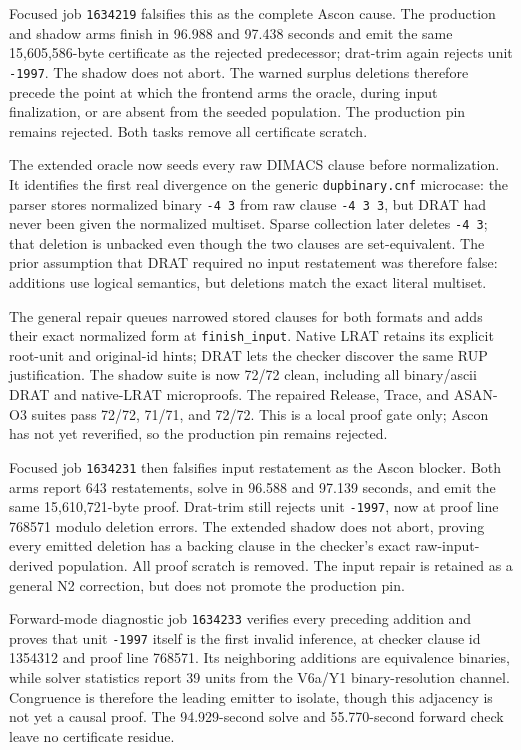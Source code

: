 \documentclass[11pt]{article}
\newcommand{\code}[1]{\texttt{#1}}
\begin{document}
Focused job \code{1634219} falsifies this as the complete Ascon cause. The
production and shadow arms finish in 96.988 and 97.438 seconds and emit the
same 15,605,586-byte certificate as the rejected predecessor; drat-trim again
rejects unit \code{-1997}. The shadow does not abort. The warned surplus
deletions therefore precede the point at which the frontend arms the oracle,
during input finalization, or are absent from the seeded population. The
production pin remains rejected. Both tasks remove all certificate scratch.

The extended oracle now seeds every raw DIMACS clause before normalization.
It identifies the first real divergence on the generic \code{dupbinary.cnf}
microcase: the parser stores normalized binary \code{-4 3} from raw clause
\code{-4 3 3}, but DRAT had never been given the normalized multiset. Sparse
collection later deletes \code{-4 3}; that deletion is unbacked even though the
two clauses are set-equivalent. The prior assumption that DRAT required no
input restatement was therefore false: additions use logical semantics, but
deletions match the exact literal multiset.

The general repair queues narrowed stored clauses for both formats and adds
their exact normalized form at \code{finish\_input}. Native LRAT retains its
explicit root-unit and original-id hints; DRAT lets the checker discover the
same RUP justification. The shadow suite is now 72/72 clean, including all
binary/ascii DRAT and native-LRAT microproofs. The repaired Release, Trace, and
ASAN-O3 suites pass 72/72, 71/71, and 72/72. This is a local proof gate only;
Ascon has not yet reverified, so the production pin remains rejected.

Focused job \code{1634231} then falsifies input restatement as the Ascon
blocker. Both arms report 643 restatements, solve in 96.588 and 97.139 seconds,
and emit the same 15,610,721-byte proof. Drat-trim still rejects unit
\code{-1997}, now at proof line 768571 modulo deletion errors. The extended
shadow does not abort, proving every emitted deletion has a backing clause in
the checker's exact raw-input-derived population. All proof scratch is removed.
The input repair is retained as a general N2 correction, but does not promote
the production pin.

Forward-mode diagnostic job \code{1634233} verifies every preceding addition
and proves that unit \code{-1997} itself is the first invalid inference, at
checker clause id 1354312 and proof line 768571. Its neighboring additions are
equivalence binaries, while solver statistics report 39 units from the V6a/Y1
binary-resolution channel. Congruence is therefore the leading emitter to
isolate, though this adjacency is not yet a causal proof. The 94.929-second
solve and 55.770-second forward check leave no certificate residue.
\end{document}
